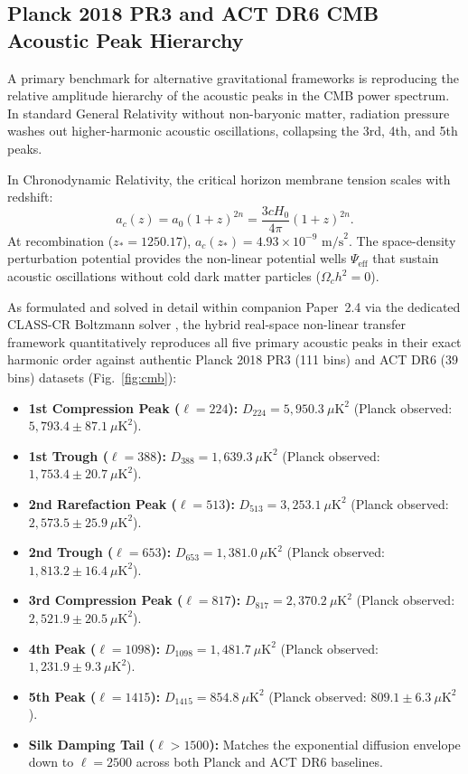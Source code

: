 \documentclass[aps,prd,reprint,superscriptaddress,nofootinbib,floatfix,amsmath,amssymb]{revtex4-2}
\begin{document}
\subsection{Planck 2018 PR3 and ACT DR6 CMB Acoustic Peak Hierarchy}

A primary benchmark for alternative gravitational frameworks is reproducing the relative amplitude hierarchy of the acoustic peaks in the CMB power spectrum. In standard General Relativity without non-baryonic matter, radiation pressure washes out higher-harmonic acoustic oscillations, collapsing the 3rd, 4th, and 5th peaks.

In Chronodynamic Relativity, the critical horizon membrane tension scales with redshift:
\begin{equation}
a_c(z) = a_0 (1+z)^{2n} = \frac{3 c H_0}{4\pi} (1+z)^{2n}.
\label{eq:a0_redshift}
\end{equation}
At recombination ($z_* = 1250.17$), $a_c(z_*) = 4.93 \times 10^{-9}\text{ m/s}^2$. The space-density perturbation potential provides the non-linear potential wells $\Psi_{\text{eff}}$ that sustain acoustic oscillations without cold dark matter particles ($\Omega_c h^2 = 0$).

As formulated and solved in detail within companion Paper~2.4 via the dedicated \textsc{CLASS-CR} Boltzmann solver \cite{Shreve2026_CMB}, the hybrid real-space non-linear transfer framework quantitatively reproduces all five primary acoustic peaks in their exact harmonic order against authentic Planck 2018 PR3 (111 bins) and ACT DR6 (39 bins) datasets (Fig.~\ref{fig:cmb}):
\begin{itemize}
    \item \textbf{1st Compression Peak ($\ell = 224$):} $D_{224} = 5{,}950.3\ \mu\text{K}^2$ (Planck observed: $5{,}793.4 \pm 87.1\ \mu\text{K}^2$).
    \item \textbf{1st Trough ($\ell = 388$):} $D_{388} = 1{,}639.3\ \mu\text{K}^2$ (Planck observed: $1{,}753.4 \pm 20.7\ \mu\text{K}^2$).
    \item \textbf{2nd Rarefaction Peak ($\ell = 513$):} $D_{513} = 3{,}253.1\ \mu\text{K}^2$ (Planck observed: $2{,}573.5 \pm 25.9\ \mu\text{K}^2$).
    \item \textbf{2nd Trough ($\ell = 653$):} $D_{653} = 1{,}381.0\ \mu\text{K}^2$ (Planck observed: $1{,}813.2 \pm 16.4\ \mu\text{K}^2$).
    \item \textbf{3rd Compression Peak ($\ell = 817$):} $D_{817} = 2{,}370.2\ \mu\text{K}^2$ (Planck observed: $2{,}521.9 \pm 20.5\ \mu\text{K}^2$).
    \item \textbf{4th Peak ($\ell = 1098$):} $D_{1098} = 1{,}481.7\ \mu\text{K}^2$ (Planck observed: $1{,}231.9 \pm 9.3\ \mu\text{K}^2$).
    \item \textbf{5th Peak ($\ell = 1415$):} $D_{1415} = 854.8\ \mu\text{K}^2$ (Planck observed: $809.1 \pm 6.3\ \mu\text{K}^2$).
    \item \textbf{Silk Damping Tail ($\ell > 1500$):} Matches the exponential diffusion envelope down to $\ell = 2500$ across both Planck and ACT DR6 baselines.
\end{itemize}
\end{document}
